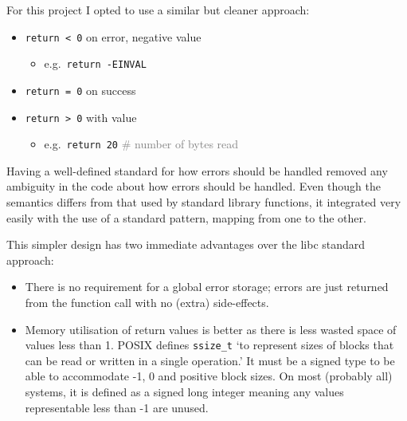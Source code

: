         For this project I opted to use a similar but cleaner approach:
        \begin{center}
            \begin{minipage}{0.88\columnwidth}
                \begin{itemize}[noitemsep]
                    \item{\texttt{return < 0} on error, negative value}
                        \begin{itemize}
                            \item[]{\small e.g.\ \texttt{return -EINVAL}}
                        \end{itemize}
                    \item{\texttt{return = 0} on success}
                    \item{\texttt{return > 0} with value}
                        \begin{itemize}
                            \item[]{\small e.g.\ \texttt{return 20} \textcolor{gray}{{\tiny\#} number of bytes read}}
                        \end{itemize}
                \end{itemize}
            \end{minipage}
        \end{center}
        \vspace{\parskip}

        Having a well-defined standard for how errors should be handled removed any ambiguity in the code about how errors should be handled. Even though the semantics differs from that used by standard library functions, it integrated very easily with the use of a standard pattern, mapping from one to the other.

        This simpler design has two immediate advantages over the libc standard approach:
        \begin{itemize}[noitemsep]
            \item{There is no requirement for a global error storage; errors are just returned from the function call with no (extra) side-effects.}
            \item{Memory utilisation of return values is better as there is less wasted space of values less than 1. POSIX defines \texttt{ssize\_t} `to represent sizes of blocks that can be read or written in a single operation.' It must be a signed type to be able to accommodate -1, 0 and positive block sizes. On most (probably all) systems, it is defined as a signed long integer meaning any values representable less than -1 are unused.}
        \end{itemize}

